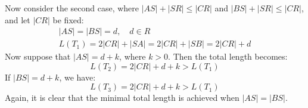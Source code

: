 \documentclass[12pt]{article}
\begin{document}
	Now consider the second case, where \( |AS| + |SR| \leq |CR| \) and \( |BS| + |SR| \leq |CR| \), and let \( |CR| \) be fixed:
	\begin{align*}
		|AS| = |BS| = d, \quad d \in R \\
		L(T_1) = 2|CR| + |SA| = 2|CR| + |SB| = 2|CR| + d
	\end{align*}
	Now suppose that \( |AS| = d + k \), where \( k > 0 \). Then the total length becomes:
	\[
	L(T_2) = 2|CR| + d + k > L(T_1)
	\]
	If \( |BS| = d + k \), we have:
	\[
	L(T_3) = 2|CR| + d + k > L(T_1)
	\]
	Again, it is clear that the minimal total length is achieved when \( |AS| = |BS| \).

	
\end{document}
